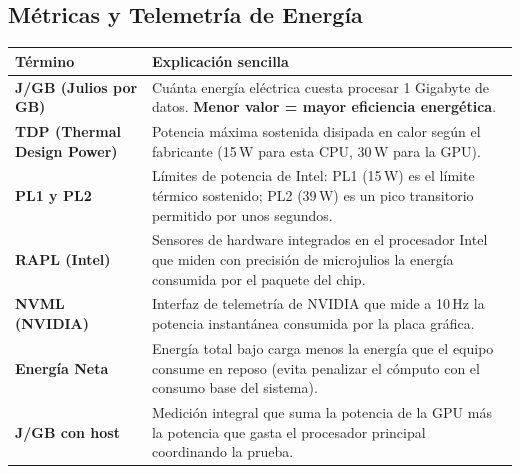 \documentclass[11pt,a4paper]{article}
\begin{document}
\subsection{Métricas y Telemetría de Energía}
\noindent\begin{tabularx}{\linewidth}{@{}p{3.8cm} X@{}}
\toprule
\textbf{Término} & \textbf{Explicación sencilla} \\
\midrule
\textbf{J/GB (Julios por GB)} & Cuánta energía eléctrica cuesta procesar 1 Gigabyte de datos. \textbf{Menor valor = mayor eficiencia energética}. \\
\addlinespace
\textbf{TDP (Thermal Design Power)} & Potencia máxima sostenida disipada en calor según el fabricante (15\,W para esta CPU, 30\,W para la GPU). \\
\addlinespace
\textbf{PL1 y PL2} & Límites de potencia de Intel: PL1 (15\,W) es el límite térmico sostenido; PL2 (39\,W) es un pico transitorio permitido por unos segundos. \\
\addlinespace
\textbf{RAPL (Intel)} & Sensores de hardware integrados en el procesador Intel que miden con precisión de microjulios la energía consumida por el paquete del chip. \\
\addlinespace
\textbf{NVML (NVIDIA)} & Interfaz de telemetría de NVIDIA que mide a 10\,Hz la potencia instantánea consumida por la placa gráfica. \\
\addlinespace
\textbf{Energía Neta} & Energía total bajo carga menos la energía que el equipo consume en reposo (evita penalizar el cómputo con el consumo base del sistema). \\
\addlinespace
\textbf{J/GB con host} & Medición integral que suma la potencia de la GPU más la potencia que gasta el procesador principal coordinando la prueba. \\
\bottomrule
\end{tabularx}

\vspace{1.2em}
\end{document}
